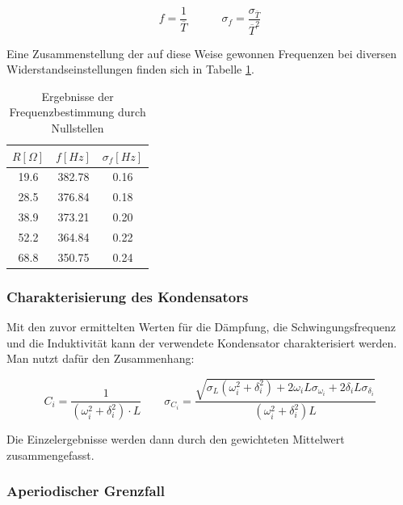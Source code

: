 \documentclass[12pt,a4paper]{article}
\begin{document}
\begin{equation}
f=\frac{1}{\overline{T}} \quad \quad \quad
\sigma_f=\frac{\sigma_{\overline{T}}}{\overline{T}^2}
\end{equation}

Eine Zusammenstellung der auf diese Weise gewonnen Frequenzen bei diversen Widerstandseinstellungen finden sich in Tabelle \ref{tab:Frequenzen}.

\begin{table}
\begin{center}
\begin{tabular}{|c|c|c|}
\hline
$R[\Omega]$ & $f[Hz]$ & $\sigma_f[Hz]$ \\
\hline
 19.6 & 382.78 & 0.16\\
\hline
 28.5 & 376.84 & 0.18\\
\hline
 38.9 & 373.21 & 0.20\\
\hline
 52.2 & 364.84 & 0.22\\
\hline
 68.8 & 350.75 & 0.24\\
\hline
\end{tabular}
\end{center}
\caption{Ergebnisse der Frequenzbestimmung durch Nullstellen}
\label{tab:Frequenzen}
\end{table}



\subsubsection{Charakterisierung des Kondensators}
Mit den zuvor ermittelten Werten für die Dämpfung, die Schwingungsfrequenz und die Induktivität kann der verwendete Kondensator charakterisiert werden. Man nutzt dafür den Zusammenhang:

\begin{equation}
C_i=\frac{1}{(\omega_i^2+\delta_i^2)\cdot L} \quad \quad 
\sigma_{C_i}=\frac{\sqrt{\sigma_L(\omega_i^2+\delta_i^2)+2\omega_i L \sigma_{\omega_i}+2 \delta_i L \sigma_{\delta_i}}}{(\omega_i^2+\delta_i^2)L} 
\end{equation}

Die Einzelergebnisse werden dann durch den gewichteten Mittelwert zusammengefasst.



\subsubsection{Aperiodischer Grenzfall}
\end{document}
